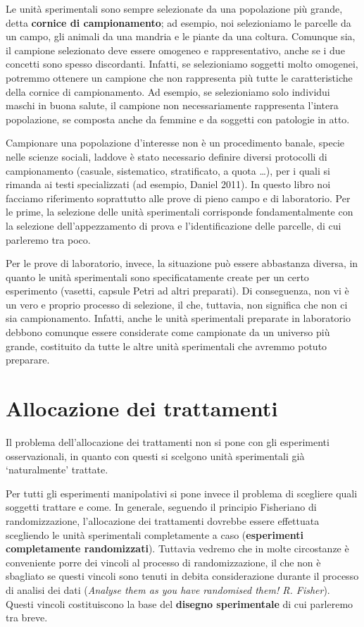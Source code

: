 \documentclass[a4paper,12pt,oneside]{book}
\begin{document}
Le unità sperimentali sono sempre selezionate da una popolazione più grande, detta \textbf{cornice di campionamento}; ad esempio, noi selezioniamo le parcelle da un campo, gli animali da una mandria e le piante da una coltura. Comunque sia, il campione selezionato deve essere omogeneo e rappresentativo, anche se i due concetti sono spesso discordanti. Infatti, se selezioniamo soggetti molto omogenei, potremmo ottenere un campione che non rappresenta più tutte le caratteristiche della cornice di campionamento. Ad esempio, se selezioniamo solo individui maschi in buona salute, il campione non necessariamente rappresenta l'intera popolazione, se composta anche da femmine e da soggetti con patologie in atto.

Campionare una popolazione d'interesse non è un procedimento banale, specie nelle scienze sociali, laddove è stato necessario definire diversi protocolli di campionamento (casuale, sistematico, stratificato, a quota \ldots), per i quali si rimanda ai testi specializzati (ad esempio, Daniel 2011). In questo libro noi facciamo riferimento soprattutto alle prove di pieno campo e di laboratorio. Per le prime, la selezione delle unità sperimentali corrisponde fondamentalmente con la selezione dell'appezzamento di prova e l'identificazione delle parcelle, di cui parleremo tra poco.

Per le prove di laboratorio, invece, la situazione può essere abbastanza diversa, in quanto le unità sperimentali sono specificatamente create per un certo esperimento (vasetti, capsule Petri ad altri preparati). Di conseguenza, non vi è un vero e proprio processo di selezione, il che, tuttavia, non significa che non ci sia campionamento. Infatti, anche le unità sperimentali preparate in laboratorio debbono comunque essere considerate come campionate da un universo più grande, costituito da tutte le altre unità sperimentali che avremmo potuto preparare.

\hypertarget{allocazione-dei-trattamenti}{%
\section{Allocazione dei trattamenti}\label{allocazione-dei-trattamenti}}

Il problema dell'allocazione dei trattamenti non si pone con gli esperimenti osservazionali, in quanto con questi si scelgono unità sperimentali già `naturalmente' trattate.

Per tutti gli esperimenti manipolativi si pone invece il problema di scegliere quali soggetti trattare e come. In generale, seguendo il principio Fisheriano di randomizzazione, l'allocazione dei trattamenti dovrebbe essere effettuata scegliendo le unità sperimentali completamente a caso (\textbf{esperimenti completamente randomizzati}). Tuttavia vedremo che in molte circostanze è conveniente porre dei vincoli al processo di randomizzazione, il che non è sbagliato se questi vincoli sono tenuti in debita considerazione durante il processo di analisi dei dati (\emph{Analyse them as you have randomised them! R. Fisher}). Questi vincoli costituiscono la base del \textbf{disegno sperimentale} di cui parleremo tra breve.
\end{document}
